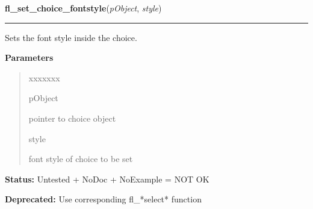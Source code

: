 \hspace{.8\funcindent}\begin{boxedminipage}{\funcwidth}

    \raggedright \textbf{fl\_set\_choice\_fontstyle}(\textit{pObject}, \textit{style})

    \vspace{-1.5ex}

    \rule{\textwidth}{0.5\fboxrule}
\setlength{\parskip}{2ex}
    Sets the font style inside the choice.

\setlength{\parskip}{1ex}
      \textbf{Parameters}
      \vspace{-1ex}

      \begin{quote}
        \begin{Ventry}{xxxxxxx}

          \item[pObject]

          pointer to choice object

          \item[style]

          font style of choice to be set

        \end{Ventry}

      \end{quote}

\textbf{Status:} Untested + NoDoc + NoExample = NOT OK



\textbf{Deprecated:} Use corresponding fl\_*select* function



    \end{boxedminipage}

    \label{xformslib:library:fl_set_choice_align}

    \vspace{0.5ex}

